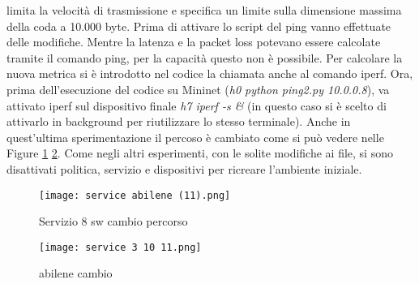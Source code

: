limita la velocità di trasmissione e specifica un limite sulla dimensione massima della coda a 10.000 byte.
Prima di attivare lo script del ping vanno effettuate delle modifiche.
Mentre la latenza e la packet loss potevano essere calcolate tramite il comando ping, per la capacità questo non è possibile.
Per calcolare la nuova metrica si è introdotto nel codice la chiamata anche al comando iperf.
Ora, prima dell'esecuzione del codice su Mininet (\textit{h0 python ping2.py 10.0.0.8}), va attivato iperf sul dispositivo finale \textit{h7 iperf -s \&} (in questo caso si è scelto di attivarlo in background per riutilizzare lo stesso terminale).
Anche in quest'ultima sperimentazione il percoso è cambiato come si può vedere nelle Figure \ref{fig:abilene dopo} \ref{fig:abilene post}.
Come negli altri esperimenti, con le solite modifiche ai file, si sono disattivati politica, servizio e dispositivi per ricreare l'ambiente iniziale.
\begin{figure}[h]
    \centering
   \texttt{[image: service abilene (11).png]}
    \caption{Servizio 8 sw cambio percorso}
    \label{fig:abilene dopo}
\end{figure}
\begin{figure}[h]
    \centering
   \texttt{[image: service 3 10 11.png]}
    \caption{abilene cambio }
    \label{fig:abilene post}
\end{figure}


